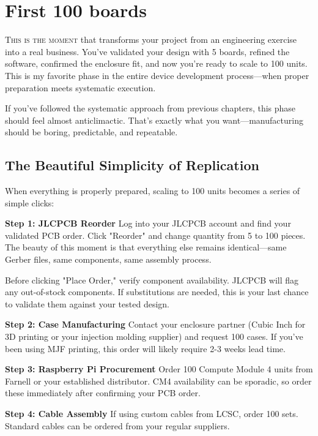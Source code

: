 \chapter{First 100 boards}

\lettrine{T}{his is the moment} that transforms your project from an engineering exercise into a real business. You've validated your design with 5 boards, refined the software, confirmed the enclosure fit, and now you're ready to scale to 100 units. This is my favorite phase in the entire device development process—when proper preparation meets systematic execution.

If you've followed the systematic approach from previous chapters, this phase should feel almost anticlimactic. That's exactly what you want—manufacturing should be boring, predictable, and repeatable.

\section{The Beautiful Simplicity of Replication}

When everything is properly prepared, scaling to 100 units becomes a series of simple clicks:

\textbf{Step 1: JLCPCB Reorder}
Log into your JLCPCB account and find your validated PCB order. Click "Reorder" and change quantity from 5 to 100 pieces. The beauty of this moment is that everything else remains identical—same Gerber files, same components, same assembly process.

\begin{tcolorbox}[colback=yellow!10,colframe=orange!75!black,title=Component Availability Check]
Before clicking "Place Order," verify component availability. JLCPCB will flag any out-of-stock components. If substitutions are needed, this is your last chance to validate them against your tested design.
\end{tcolorbox}

\textbf{Step 2: Case Manufacturing}
Contact your enclosure partner (Cubic Inch for 3D printing or your injection molding supplier) and request 100 cases. If you've been using MJF printing, this order will likely require 2-3 weeks lead time.

\textbf{Step 3: Raspberry Pi Procurement}
Order 100 Compute Module 4 units from Farnell or your established distributor. CM4 availability can be sporadic, so order these immediately after confirming your PCB order.

\textbf{Step 4: Cable Assembly}
If using custom cables from LCSC, order 100 sets. Standard cables can be ordered from your regular suppliers.


